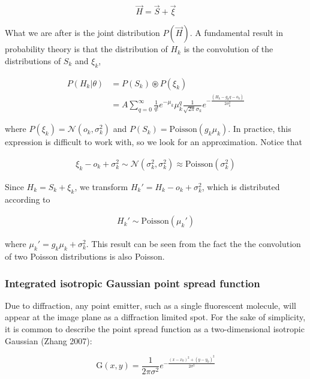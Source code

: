 \documentclass{ucetd}
\begin{document}
\begin{equation}
\vec{H} = \vec{S} + \vec{\xi}
\end{equation}

What we are after is the joint distribution $P(\vec{H})$. A fundamental result in probability theory is that the distribution of $H_{k}$ is the convolution of the distributions of $S_{k}$ and $\xi_{k}$,

\begin{align}
P(H_{k}|\theta) &= P(S_{k})\circledast P(\xi_{k})\\
&= A\sum_{q=0}^{\infty} \frac{1}{q!}e^{-\mu_{k}}\mu_{k}^{q}\frac{1}{\sqrt{2\pi}\sigma_{k}}e^{-\frac{(H_{k}-g_{k}q-o_{k})}{2\sigma_{k}^{2}}}
\end{align}

where $P(\xi_{k}) = \mathcal{N}(o_{k},\sigma_{k}^{2})$ and $P(S_{k}) = \mathrm{Poisson}(g_{k}\mu_{k})$. In practice, this expression is difficult to work with, so we look for an approximation. Notice that 

\begin{align*}
\xi_{k} - o_{k} + \sigma_{k}^{2} \sim \mathcal{N}(\sigma_{k}^{2},\sigma_{k}^{2}) \approx \mathrm{Poisson}(\sigma_{k}^{2})
\end{align*}

Since $H_{k} = S_{k} + \xi_{k}$, we transform $H_{k}' = H_{k} - o_{k} + \sigma_{k}^{2}$, which is distributed according to 

\begin{align*}
H_{k}' \sim \mathrm{Poisson}(\mu_{k}')
\end{align*}

where $\mu_{k}' = g_{k}\mu_{k} + \sigma_{k}^{2}$. This result can be seen from the fact the the convolution of two Poisson distributions is also Poisson.

\subsubsection{Integrated isotropic Gaussian point spread function}

Due to diffraction, any point emitter, such as a single fluorescent molecule, will appear at the image plane as a diffraction limited spot. For the sake of simplicity, it is common to describe the point spread function as a two-dimensional isotropic Gaussian (Zhang 2007):

\begin{equation*}
\mathrm{G}(x,y) = \frac{1}{2\pi\sigma^{2}}e^{-\frac{(x-x_{0})^{2}+(y-y_{0})^{2}}{2\sigma^{2}}}
\end{equation*}
\end{document}
